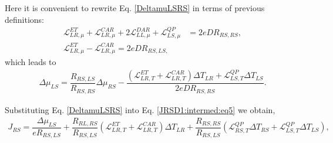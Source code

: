 Here it is convenient to rewrite Eq. \eqref{DeltamuLSRS} in terms of previous definitions:
\begin{align*}
\mathcal{L}_{LR,\mu}^{ET}+\mathcal{L}_{LR,\mu}^{CAR}+2\mathcal{L}_{LL,\mu}^{DAR}+\mathcal{L}^{QP}_{LS,\mu}
&=
2eDR_{RS,RS},
\\
\mathcal{L}_{LR,\mu}^{ET}-\mathcal{L}_{LR,\mu}^{CAR}=2eDR_{RS,LS,}
\end{align*}
which leads to
\begin{align}\label{DeltamuLSRS2}
\Delta\mu_{LS}=\dfrac{R_{RS,LS}}{R_{RS,RS}}\Delta\mu_{RS}
-
\dfrac{
(\mathcal{L}_{LR,T}^{ET}+\mathcal{L}_{LR,T}^{CAR})\Delta T_{LR}
+
\mathcal{L}^{QP}_{LS,T}\Delta T_{LS}}{2eDR_{RS,RS}}.
\end{align}


Substituting Eq. \eqref{DeltamuLSRS} into Eq. \eqref{JRSD1:intermed:eq5} we obtain,
\begin{multline*}
J_{RS}=
\dfrac{\Delta\mu_{LS}}{eR_{RS,LS}}
+
\dfrac{R_{RL,RS}}{R_{RS,LS}}
(\mathcal{L}_{LR,T}^{ET}+\mathcal{L}_{LR,T}^{CAR})\Delta T_{LR}
+
\dfrac{R_{RS,RS}}{R_{RS,LS}}(\mathcal{L}^{QP}_{RS,T}\Delta T_{RS}+\mathcal{L}^{QP}_{LS,T}\Delta T_{LS}),
\end{multline*}